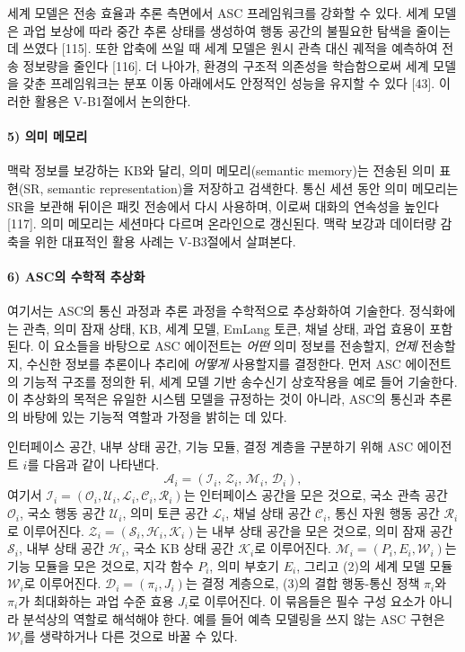 세계 모델은 전송 효율과 추론 측면에서 ASC 프레임워크를 강화할 수 있다.
세계 모델은 과업 보상에 따라 중간 추론 상태를 생성하여 행동 공간의 불필요한 탐색을 줄이는 데 쓰였다 [115].
또한 압축에 쓰일 때 세계 모델은 원시 관측 대신 궤적을 예측하여 전송 정보량을 줄인다 [116].
더 나아가, 환경의 구조적 의존성을 학습함으로써 세계 모델을 갖춘 프레임워크는 분포 이동 아래에서도 안정적인 성능을 유지할 수 있다 [43].
이러한 활용은 V-B1절에서 논의한다.

\paragraph{5) 의미 메모리}
맥락 정보를 보강하는 KB와 달리, 의미 메모리(semantic memory)는 전송된 의미 표현(SR, semantic representation)을 저장하고 검색한다.
통신 세션 동안 의미 메모리는 SR을 보관해 뒤이은 패킷 전송에서 다시 사용하며, 이로써 대화의 연속성을 높인다 [117].
의미 메모리는 세션마다 다르며 온라인으로 갱신된다.
맥락 보강과 데이터량 감축을 위한 대표적인 활용 사례는 V-B3절에서 살펴본다.

\paragraph{6) ASC의 수학적 추상화}
여기서는 ASC의 통신 과정과 추론 과정을 수학적으로 추상화하여 기술한다.
정식화에는 관측, 의미 잠재 상태, KB, 세계 모델, EmLang 토큰, 채널 상태, 과업 효용이 포함된다.
이 요소들을 바탕으로 ASC 에이전트는 \textit{어떤} 의미 정보를 전송할지, \textit{언제} 전송할지, 수신한 정보를 추론이나 추리에 \textit{어떻게} 사용할지를 결정한다.
먼저 ASC 에이전트의 기능적 구조를 정의한 뒤, 세계 모델 기반 송수신기 상호작용을 예로 들어 기술한다.
이 추상화의 목적은 유일한 시스템 모델을 규정하는 것이 아니라, ASC의 통신과 추론의 바탕에 있는 기능적 역할과 가정을 밝히는 데 있다.

인터페이스 공간, 내부 상태 공간, 기능 모듈, 결정 계층을 구분하기 위해 ASC 에이전트 $i$를 다음과 같이 나타낸다.
\begin{equation}
\mathcal{A}_i = (\mathcal{I}_i,\, \mathcal{Z}_i,\, \mathcal{M}_i,\, \mathcal{D}_i), \tag{1}
\end{equation}
여기서 $\mathcal{I}_i = (\mathcal{O}_i, \mathcal{U}_i, \mathcal{L}_i, \mathcal{C}_i, \mathcal{R}_i)$는 인터페이스 공간을 모은 것으로, 국소 관측 공간 $\mathcal{O}_i$, 국소 행동 공간 $\mathcal{U}_i$, 의미 토큰 공간 $\mathcal{L}_i$, 채널 상태 공간 $\mathcal{C}_i$, 통신 자원 행동 공간 $\mathcal{R}_i$로 이루어진다.
$\mathcal{Z}_i = (\mathcal{S}_i, \mathcal{H}_i, \mathcal{K}_i)$는 내부 상태 공간을 모은 것으로, 의미 잠재 공간 $\mathcal{S}_i$, 내부 상태 공간 $\mathcal{H}_i$, 국소 KB 상태 공간 $\mathcal{K}_i$로 이루어진다.
$\mathcal{M}_i = (P_i, E_i, \mathcal{W}_i)$는 기능 모듈을 모은 것으로, 지각 함수 $P_i$, 의미 부호기 $E_i$, 그리고 (2)의 세계 모델 모듈 $\mathcal{W}_i$로 이루어진다.
$\mathcal{D}_i = (\pi_i, J_i)$는 결정 계층으로, (3)의 결합 행동-통신 정책 $\pi_i$와 $\pi_i$가 최대화하는 과업 수준 효용 $J_i$로 이루어진다.
이 묶음들은 필수 구성 요소가 아니라 분석상의 역할로 해석해야 한다.
예를 들어 예측 모델링을 쓰지 않는 ASC 구현은 $\mathcal{W}_i$를 생략하거나 다른 것으로 바꿀 수 있다.

